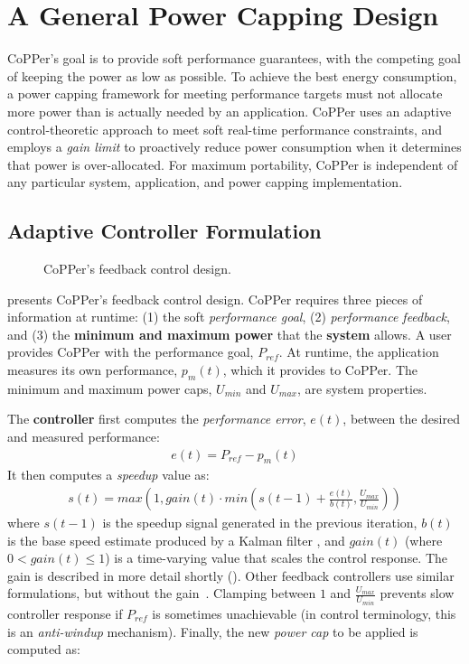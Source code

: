 \section{A General Power Capping Design}
\label{sec:copper-framework}

CoPPer's goal is to provide soft performance guarantees, with the competing goal of keeping the power as low as possible.
To achieve the best energy consumption, a power capping framework for meeting performance targets must not allocate more power than is actually needed by an application.
CoPPer uses an adaptive control-theoretic approach to meet soft real-time performance constraints, and employs a \emph{gain limit} to proactively reduce power consumption when it determines that power is over-allocated.
For maximum portability, CoPPer is independent of any particular system, application, and power capping implementation.


\subsection{Adaptive Controller Formulation}

\begin{figure}[t]
  \centering
  
  \caption{CoPPer's feedback control design.}
  \label{fig:copper-runtime}
\end{figure}

 presents CoPPer's feedback control design.
CoPPer requires three pieces of information at runtime: (1) the soft \emph{performance goal}, (2) \emph{performance feedback}, and (3) the \textbf{minimum and maximum power} that the \textbf{system} allows.
A user provides CoPPer with the performance goal, $P_{ref}$.
At runtime, the application measures its own performance, $p_m(t)$, which it provides to CoPPer.
The minimum and maximum power caps, $U_{min}$ and $U_{max}$, are system properties.

The \textbf{controller} first computes the \emph{performance error}, $e(t)$, between the desired and measured performance:
\begin{eqnarray}
  e(t) = P_{ref} - p_m(t)
  \label{eqn:copper-error}
\end{eqnarray}
It then computes a \emph{speedup} value as:
\begin{eqnarray}
  s(t) = max\left(1, gain(t) \cdot min\left(s(t-1) + \frac{e(t)}{b(t)}, \frac{U_{max}}{U_{min}}\right)\right)
  \label{eqn:copper-speedup-control}
\end{eqnarray}
where $s(t-1)$ is the speedup signal generated in the previous iteration, $b(t)$ is the base speed estimate produced by a Kalman filter \cite{welch2006kalman}, and $gain(t)$ (where $0 < gain(t) \le 1$) is a time-varying value that scales the control response.
The gain is described in more detail shortly ().
Other feedback controllers use similar formulations, but without the gain~\cite{Bard,POET}.
Clamping between $1$ and $\frac{U_{max}}{U_{min}}$ prevents slow controller response if $P_{ref}$ is sometimes unachievable (in control terminology, this is an \emph{anti-windup} mechanism).
Finally, the new \emph{power cap} to be applied is computed as:

